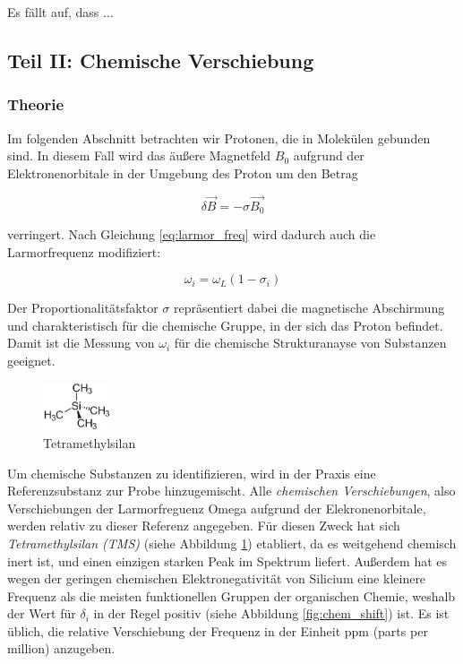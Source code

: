 \documentclass[a4paper]{scrartcl} %
\begin{document}
Es fällt auf, dass ...

\newpage

\subsection{Teil II: Chemische Verschiebung}

\subsubsection{Theorie}

Im folgenden Abschnitt betrachten wir Protonen, die in Molekülen gebunden sind. In diesem Fall wird das äußere Magnetfeld $B_0$ aufgrund der Elektronenorbitale in der Umgebung des Proton um den Betrag

\begin{equation}
	\delta \vec{B} = - \sigma \vec{B_0}
	\label{eq:delta_B}
\end{equation}

verringert. Nach Gleichung \eqref{eq:larmor_freq} wird dadurch auch die Larmorfrequenz modifiziert:

\begin{equation}
	\omega_i = \omega_L \left(1-\sigma_i \right)
	\label{eq:omega_i}
\end{equation}

Der Proportionalitätsfaktor $\sigma$ repräsentiert dabei die magnetische Abschirmung und charakteristisch für die chemische Gruppe, in der sich das Proton befindet. Damit ist die Messung von $\omega_i$ für die chemische Strukturanayse von Substanzen geeignet.

\begin{figure}
	\begin{center}
		\includegraphics[width = 0.18\textwidth]{./Resources/Tetramethylsilan.png}
	\end{center}
  \caption{Te\-tramethylsilan}
  \label{fig:TMS}
\end{figure}

Um chemische Substanzen zu identifizieren, wird in der Praxis eine Referenzsubstanz zur Probe hinzugemischt. Alle \emph{chemischen Verschiebungen}, also Verschiebungen der Larmorfreguenz Omega aufgrund der Elekronenorbitale, werden relativ zu dieser Referenz angegeben. Für diesen Zweck hat sich \emph{Tetramethylsilan (TMS)} \autocite{TMS} (siehe Abbildung \ref{fig:TMS}) etabliert, da es weitgehend chemisch inert ist, und einen einzigen starken Peak im Spektrum liefert. Außerdem hat es wegen der geringen chemischen Elektronegativität von Silicium eine kleinere Frequenz als die meisten funktionellen Gruppen der organischen Chemie, weshalb der Wert für $\delta_i$ in der Regel positiv (siehe Abbildung \ref{fig:chem_shift}) ist. Es ist üblich, die relative Verschiebung der Frequenz in der Einheit ppm (parts per million) anzugeben.
\end{document}
